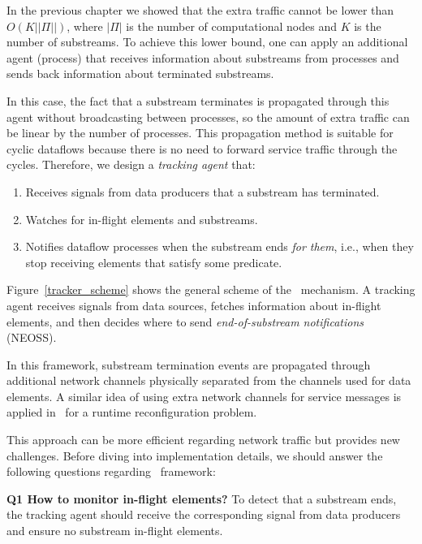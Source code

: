 
In the previous chapter we showed that the extra traffic cannot be lower than $O(K||\Pi||)$, where $|\Pi|$ is the number of computational nodes and $K$ is the number of substreams. To achieve this lower bound, one can apply an additional agent (process) that receives information about substreams from processes and sends back information about terminated substreams. 

In this case, the fact that a substream terminates is propagated through this agent without broadcasting between processes, so the amount of extra traffic can be linear by the number of processes. This propagation method is suitable for cyclic dataflows because there is no need to forward service traffic through the cycles. Therefore, we design a {\em tracking agent} that:

\begin{enumerate}
    \item Receives signals from data producers that a substream has terminated.
    \item Watches for in-flight elements and substreams.
    \item Notifies dataflow processes when the substream ends {\em for them}, i.e., when they stop receiving elements that satisfy some predicate.
\end{enumerate}

Figure~\ref{tracker_scheme} shows the general scheme of the \tracker\ mechanism. A tracking agent receives signals from data sources, fetches information about in-flight elements, and then decides where to send {\em end-of-substream notifications} (NEOSS).

In this framework, substream termination events are propagated through additional network channels physically separated from the channels used for data elements. A similar idea of using extra network channels for service messages is applied in~\cite{wang2022fries} for a runtime reconfiguration problem.

This approach can be more efficient regarding network traffic but provides new challenges. Before diving into implementation details, we should answer the following questions regarding \tracker\ framework:

{\bf Q1 How to monitor in-flight elements?} To detect that a substream ends, the tracking agent should receive the corresponding signal from data producers and ensure no substream in-flight elements. 

